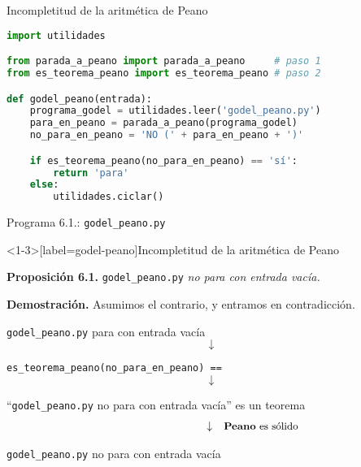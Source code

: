 \documentclass[10pt,xcolor=dvipsnames,aspectratio=169,spanish]{beamer}
\newcommand{\palabra}[1]{\texttt{\textquotesingle{}{#1}\textquotesingle{}}}
\begin{document}
\begin{frame}[fragile]{Incompletitud de la aritmética de Peano}

\begin{lstlisting}[language=Python]
import utilidades

from parada_a_peano import parada_a_peano     # paso 1
from es_teorema_peano import es_teorema_peano # paso 2

def godel_peano(entrada):
    programa_godel = utilidades.leer('godel_peano.py')
    para_en_peano = parada_a_peano(programa_godel)
    no_para_en_peano = 'NO (' + para_en_peano + ')'

    if es_teorema_peano(no_para_en_peano) == 'sí':
        return 'para'
    else:
        utilidades.ciclar()
\end{lstlisting}
\vspace*{-4mm}
\begin{center}
{\small Programa 6.1.: \texttt{godel\_peano.py}}
\end{center}

\end{frame}


\begin{frame}<1-3>[label=godel-peano]{Incompletitud de la aritmética de Peano}

\textbf{Proposición 6.1.} \texttt{godel\_peano.py} \emph{no para con entrada vacía.}

\pause
\vspace{5mm}

\textbf{Demostración.} Asumimos el contrario, y entramos en contradicción.

\begin{center}
\pause
\texttt{godel\_peano.py} para con entrada vacía
\vspace*{-2mm}
\pause
$$\downarrow$$

\vspace*{-2mm}
\texttt{es\_teorema\_peano(no\_para\_en\_peano) == \palabra{sí}}
\vspace*{-2mm}
\pause
$$\downarrow$$

\vspace*{-2mm}
``\texttt{godel\_peano.py} no para con entrada vacía'' es un teorema
\vspace*{-2mm}
\pause
$$\begin{matrix}
    \hspace{22mm} & \downarrow & \text{\small \textbf{Peano} es sólido}
\end{matrix}$$

\vspace*{-2mm}
\texttt{godel\_peano.py} no para con entrada vacía \hspace{2mm} {\large\lightning}
\end{center}

\vspace*{-9.5mm}

\pause[6]{\hfill\square}

\end{frame}
\end{document}
